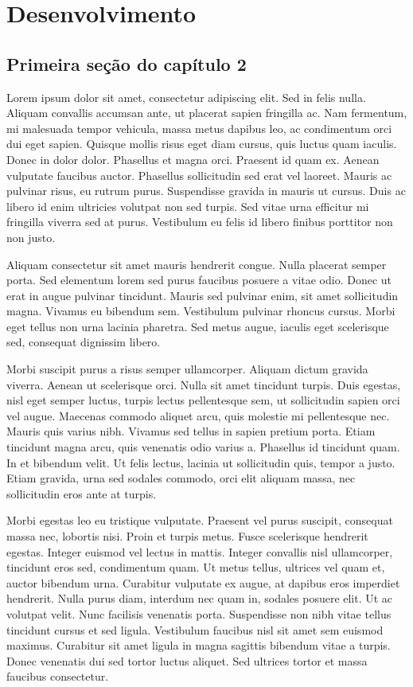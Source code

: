 \chapter{Desenvolvimento}

\section{Primeira seção do capítulo 2}

Lorem ipsum dolor sit amet, consectetur adipiscing elit. Sed in felis nulla. Aliquam convallis accumsan ante, ut placerat sapien fringilla ac. Nam fermentum, mi malesuada tempor vehicula, massa metus dapibus leo, ac condimentum orci dui eget sapien. Quisque mollis risus eget diam cursus, quis luctus quam iaculis. Donec in dolor dolor. Phasellus et magna orci. Praesent id quam ex. Aenean vulputate faucibus auctor. Phasellus sollicitudin sed erat vel laoreet. Mauris ac pulvinar risus, eu rutrum purus. Suspendisse gravida in mauris ut cursus. Duis ac libero id enim ultricies volutpat non sed turpis. Sed vitae urna efficitur mi fringilla viverra sed at purus. Vestibulum eu felis id libero finibus porttitor non non justo.

Aliquam consectetur sit amet mauris hendrerit congue. Nulla placerat semper porta. Sed elementum lorem sed purus faucibus posuere a vitae odio. Donec ut erat in augue pulvinar tincidunt. Mauris sed pulvinar enim, sit amet sollicitudin magna. Vivamus eu bibendum sem. Vestibulum pulvinar rhoncus cursus. Morbi eget tellus non urna lacinia pharetra. Sed metus augue, iaculis eget scelerisque sed, consequat dignissim libero.

Morbi suscipit purus a risus semper ullamcorper. Aliquam dictum gravida viverra. Aenean ut scelerisque orci. Nulla sit amet tincidunt turpis. Duis egestas, nisl eget semper luctus, turpis lectus pellentesque sem, ut sollicitudin sapien orci vel augue. Maecenas commodo aliquet arcu, quis molestie mi pellentesque nec. Mauris quis varius nibh. Vivamus sed tellus in sapien pretium porta. Etiam tincidunt magna arcu, quis venenatis odio varius a. Phasellus id tincidunt quam. In et bibendum velit. Ut felis lectus, lacinia ut sollicitudin quis, tempor a justo. Etiam gravida, urna sed sodales commodo, orci elit aliquam massa, nec sollicitudin eros ante at turpis.

Morbi egestas leo eu tristique vulputate. Praesent vel purus suscipit, consequat massa nec, lobortis nisi. Proin et turpis metus. Fusce scelerisque hendrerit egestas. Integer euismod vel lectus in mattis. Integer convallis nisl ullamcorper, tincidunt eros sed, condimentum quam. Ut metus tellus, ultrices vel quam et, auctor bibendum urna. Curabitur vulputate ex augue, at dapibus eros imperdiet hendrerit. Nulla purus diam, interdum nec quam in, sodales posuere elit. Ut ac volutpat velit. Nunc facilisis venenatis porta. Suspendisse non nibh vitae tellus tincidunt cursus et sed ligula. Vestibulum faucibus nisl sit amet sem euismod maximus. Curabitur sit amet ligula in magna sagittis bibendum vitae a turpis. Donec venenatis dui sed tortor luctus aliquet. Sed ultrices tortor et massa faucibus consectetur.


